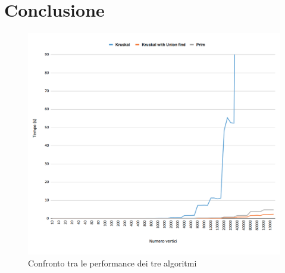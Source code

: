 \section{Conclusione}
\begin{figure}[H]
	\hspace{-1cm}\includegraphics[width=19cm]{Img/compare.png}
	\caption{Confronto tra le performance dei tre algoritmi}
\end{figure}
\pagebreak